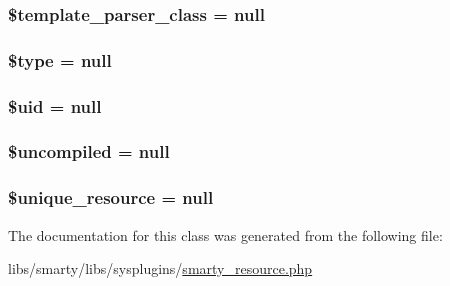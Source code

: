 \subsubsection[{\$template\+\_\+parser\+\_\+class}]{\setlength{\rightskip}{0pt plus 5cm}\$template\+\_\+parser\+\_\+class = null}\label{class_smarty___template___source_a5861bfb4f75ed665b42ce8eba8ae51f8}
\hypertarget{class_smarty___template___source_a9a4a6fba2208984cabb3afacadf33919}{}
\subsubsection[{\$type}]{\setlength{\rightskip}{0pt plus 5cm}\$type = null}\label{class_smarty___template___source_a9a4a6fba2208984cabb3afacadf33919}
\hypertarget{class_smarty___template___source_a109bbd7f4add27541707b191b73ef84a}{}
\subsubsection[{\$uid}]{\setlength{\rightskip}{0pt plus 5cm}\$uid = null}\label{class_smarty___template___source_a109bbd7f4add27541707b191b73ef84a}
\hypertarget{class_smarty___template___source_ab058dde32f958583924531d198c63225}{}
\subsubsection[{\$uncompiled}]{\setlength{\rightskip}{0pt plus 5cm}\$uncompiled = null}\label{class_smarty___template___source_ab058dde32f958583924531d198c63225}
\hypertarget{class_smarty___template___source_a44edb9ab90ad990172ef3a2d9e83225d}{}
\subsubsection[{\$unique\+\_\+resource}]{\setlength{\rightskip}{0pt plus 5cm}\$unique\+\_\+resource = null}\label{class_smarty___template___source_a44edb9ab90ad990172ef3a2d9e83225d}


The documentation for this class was generated from the following file\+:\begin{DoxyCompactItemize}
\item 
libs/smarty/libs/sysplugins/\hyperlink{smarty__resource_8php}{smarty\+\_\+resource.\+php}\end{DoxyCompactItemize}
